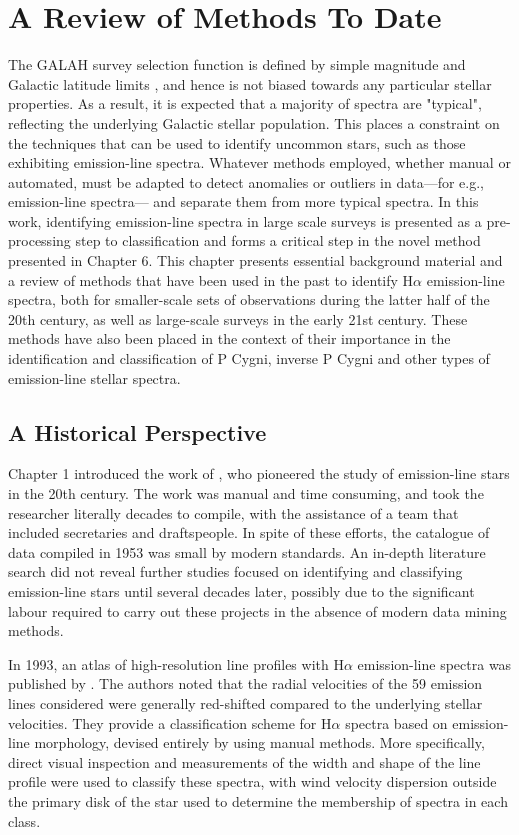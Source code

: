 \chapter{A Review of Methods To Date}

The GALAH survey selection function is defined by simple magnitude and Galactic latitude limits \citep{Martell+2017}, and hence is not biased towards any particular stellar properties. As a result, it is expected that a majority of spectra are "typical", reflecting the underlying Galactic stellar population. This places a constraint on the techniques that can be used to identify uncommon stars, such as those exhibiting emission-line spectra. Whatever methods employed, whether manual or automated, must be adapted to detect anomalies or outliers in data—for e.g., emission-line spectra— and separate them from more typical spectra. In this work, identifying emission-line spectra in large scale surveys is presented as a pre-processing step to classification and forms a critical step in the novel method presented in Chapter 6. This chapter presents essential background material and a review of methods that have been used in the past to identify H$\alpha$ emission-line spectra, both for smaller-scale sets of observations during the latter half of the 20th century, as well as large-scale surveys in the early 21st century. These methods have also been placed in the context of their importance in the identification and classification of P Cygni, inverse P Cygni and other types of emission-line stellar spectra.

\section{A Historical Perspective}
Chapter 1 introduced the work of \citet{1953PDAO....9....1B}, who pioneered the study of emission-line stars in the 20th century. The work was manual and time consuming, and took the researcher literally decades to compile, with the assistance of a team that included secretaries and draftspeople. In spite of these efforts, the catalogue of data compiled in 1953 was small by modern standards. An in-depth literature search did not reveal further studies focused on identifying and classifying emission-line stars until several decades later, possibly due to the significant labour required to carry out these projects in the absence of modern data mining methods. 

In 1993, an atlas of high-resolution line profiles with H$\alpha$ emission-line spectra was published by \citet{van1993atlas}. The authors noted that the radial velocities of the 59 emission lines considered were generally red-shifted compared to the underlying stellar velocities. They provide a classification scheme for H$\alpha$ spectra based on emission-line morphology, devised entirely by using manual methods. More specifically, direct visual inspection and measurements of the width and shape of the line profile were used to classify these spectra, with wind velocity dispersion outside the primary disk of the star used to determine the membership of spectra in each class.


